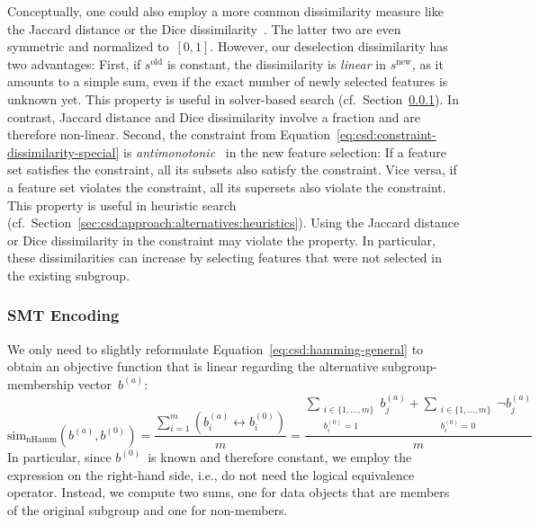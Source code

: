 \documentclass{article}
\theoremstyle{definition}
\begin{document}
Conceptually, one could also employ a more common dissimilarity measure like the Jaccard distance or the Dice dissimilarity~\cite{choi2010survey}.
The latter two are even symmetric and normalized to~$[0,1]$.
However, our deselection dissimilarity has two advantages:
First, if $s^{\text{old}}$ is constant, the dissimilarity is \emph{linear} in $s^{\text{new}}$, as it amounts to a simple sum, even if the exact number of newly selected features is unknown yet.
This property is useful in solver-based search (cf.~Section~\ref{sec:csd:approach:alternatives:smt}).
In contrast, Jaccard distance and Dice dissimilarity involve a fraction and are therefore non-linear.
Second, the constraint from Equation~\ref{eq:csd:constraint-dissimilarity-special} is \emph{antimonotonic}~\cite{ng1998exploratory} in the new feature selection:
If a feature set satisfies the constraint, all its subsets also satisfy the constraint.
Vice versa, if a feature set violates the constraint, all its supersets also violate the constraint.
This property is useful in heuristic search (cf.~Section~\ref{sec:csd:approach:alternatives:heuristics}).
Using the Jaccard distance or Dice dissimilarity in the constraint may violate the property.
In particular, these dissimilarities can increase by selecting features that were not selected in the existing subgroup.

\subsubsection{SMT Encoding}
\label{sec:csd:approach:alternatives:smt}

We only need to slightly reformulate Equation~\ref{eq:csd:hamming-general} to obtain an objective function that is linear regarding the alternative subgroup-membership vector~$b^{(a)}$:
%
\begin{equation}
	\text{sim}_{\text{nHamm}}(b^{(a)}, b^{(0)}) = \frac{\sum_{i=1}^m \left( b_i^{(a)} \leftrightarrow b_i^{(0)} \right) }{m} = \frac{\sum\limits_{\substack{i \in \{1, \dots, m\} \\ b_i^{(0)} = 1}} b_j^{(a)} + \sum\limits_{\substack{i \in \{1, \dots, m\} \\ b_i^{(0)} = 0}} \lnot b_j^{(a)}}{m}
	\label{eq:csd:hamming-smt}
\end{equation}
%
In particular, since $b^{(0)}$~is known and therefore constant, we employ the expression on the right-hand side, i.e., do not need the logical equivalence operator.
Instead, we compute two sums, one for data objects that are members of the original subgroup and one for non-members.
\end{document}
